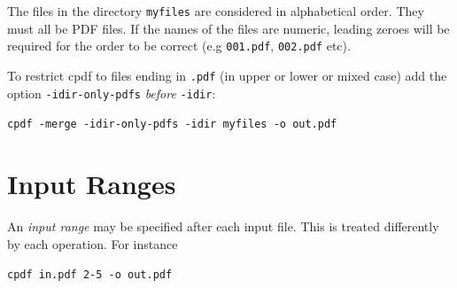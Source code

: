 \documentclass{book}
\begin{document}
  \noindent The files in the directory \verb!myfiles! are considered in alphabetical order. They must all be PDF files. If the names of the files are numeric, leading zeroes will be required for the order to be correct (e.g \verb!001.pdf!, \verb!002.pdf! etc).

To restrict cpdf to files ending in \texttt{.pdf} (in upper or lower or mixed case) add the option \texttt{-idir-only-pdfs} \textit{before} \texttt{-idir}:

  \begin{framed}
  \noindent\small\verb!cpdf -merge -idir-only-pdfs -idir myfiles -o out.pdf!
  \end{framed}

  \section{Input Ranges}
  An   \textit{input range} may be specified
after each input file. This is treated differently by each operation. For
instance

  \begin{framed}
  \noindent\small\verb!cpdf in.pdf 2-5 -o out.pdf!
  \end{framed}
\end{document}
